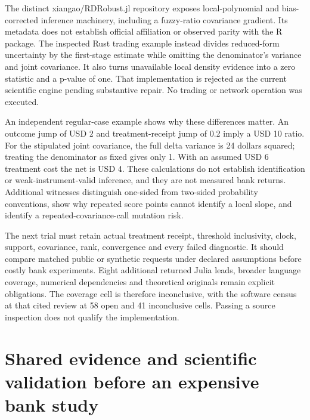 The distinct xiangao/RDRobust.jl repository exposes local-polynomial and
bias-corrected inference machinery, including a fuzzy-ratio covariance
gradient. Its metadata does not establish official affiliation or
observed parity with the R package. The inspected Rust trading example
instead divides reduced-form uncertainty by the first-stage estimate
while omitting the denominator's variance and joint covariance. It also
turns unavailable local density evidence into a zero statistic and a
p-value of one. That implementation is rejected as the current
scientific engine pending substantive repair. No trading or network
operation was executed.
\citep{exec23_otheriv_source_3,exec23_otheriv_source_4}

An independent regular-case example shows why these differences matter.
An outcome jump of USD 2 and treatment-receipt jump of 0.2 imply a USD
10 ratio. For the stipulated joint covariance, the full delta variance
is 24 dollars squared; treating the denominator as fixed gives only 1.
With an assumed USD 6 treatment cost the net is USD 4. These
calculations do not establish identification or weak-instrument-valid
inference, and they are not measured bank returns. Additional witnesses
distinguish one-sided from two-sided probability conventions, show why
repeated score points cannot identify a local slope, and identify a
repeated-covariance-call mutation risk. \citep{exec23_otheriv_reference}

The next trial must retain actual treatment receipt, threshold
inclusivity, clock, support, covariance, rank, convergence and every
failed diagnostic. It should compare matched public or synthetic
requests under declared assumptions before costly bank experiments.
Eight additional returned Julia leads, broader language coverage,
numerical dependencies and theoretical originals remain explicit
obligations. The coverage cell is therefore inconclusive, with the
software census at that cited review at 58 open and 41 inconclusive
cells. Passing a source inspection does not qualify the implementation.
\citep{sp23otheriv_progress}

\hypertarget{shared-evidence-and-scientific-validation-before-an-expensive-bank-study}{%
\section{Shared evidence and scientific validation before an expensive
bank
study}\label{shared-evidence-and-scientific-validation-before-an-expensive-bank-study}}


